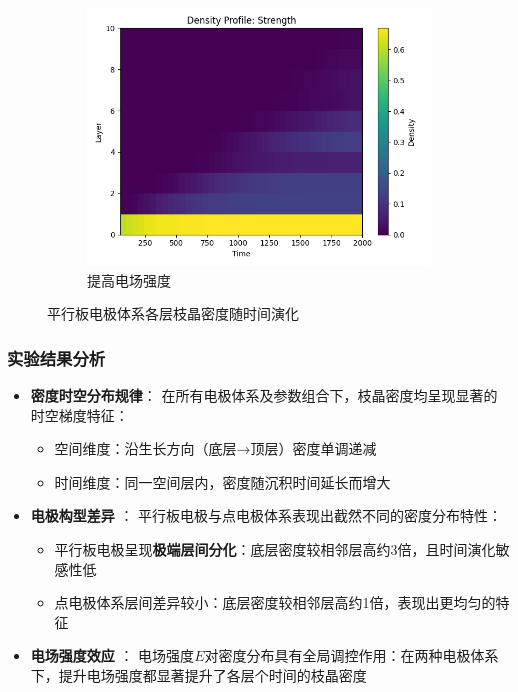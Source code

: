 \documentclass{article}
\begin{document}
\begin{figure}[H]
\begin{subfigure}[b]{0.19\textwidth}
      \end{subfigure}
      \hfill
      \begin{subfigure}[b]{0.19\textwidth}
          \centering
          \includegraphics[scale=0.2]{figs/parallel_density_profile_strength.png}
          \caption{提高电场强度}
         
      \end{subfigure}
      \caption{平行板电极体系各层枝晶密度随时间演化}
  
  \end{figure}
  
\subsubsection{实验结果分析}
\begin{itemize}
\item \textbf{密度时空分布规律}：
在所有电极体系及参数组合下，枝晶密度均呈现显著的时空梯度特征：
\begin{itemize}
\item 空间维度：沿生长方向（底层→顶层）密度单调递减
\item 时间维度：同一空间层内，密度随沉积时间延长而增大
\end{itemize}
\item \textbf{电极构型差异}  ：
平行板电极与点电极体系表现出截然不同的密度分布特性：
\begin{itemize}
    \item 平行板电极呈现\textbf{极端层间分化}：底层密度较相邻层高约3倍，且时间演化敏感性低
    \item 点电极体系层间差异较小：底层密度较相邻层高约1倍，表现出更均匀的特征
\end{itemize}

\item \textbf{电场强度效应} ： 
电场强度$E$对密度分布具有全局调控作用：在两种电极体系下，提升电场强度都显著提升了各层个时间的枝晶密度

\end{itemize}
\end{document}
